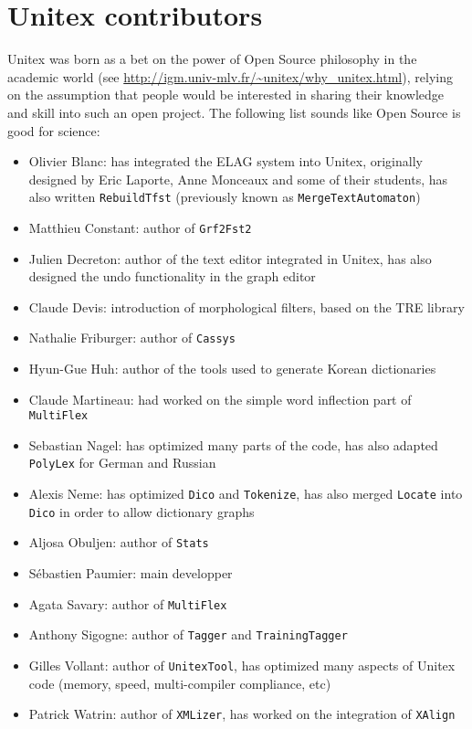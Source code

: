 \section*{Unitex contributors}
Unitex was born as a bet on the power of Open Source philosophy in the academic
world (see \url{http://igm.univ-mlv.fr/~unitex/why_unitex.html}), 
relying on the assumption that people would be interested in sharing
their knowledge and skill into such an open project. The following list
sounds like Open Source is good for science:

\begin{itemize}
    \item Olivier Blanc: has integrated the ELAG system into Unitex, originally
    designed by Eric Laporte, Anne Monceaux and some of their students, has
    also written \verb+RebuildTfst+ (previously known as \verb+MergeTextAutomaton+)
    \item Matthieu Constant: author of \verb+Grf2Fst2+
    \item Julien Decreton: author of the text editor integrated in Unitex,
    has also designed the undo functionality in the graph editor
    \item Claude Devis: introduction of morphological filters, 
    based on the TRE library
    \item Nathalie Friburger: author of \verb+Cassys+
    \item Hyun-Gue Huh: author of the tools used to
    generate Korean dictionaries
    \item Claude Martineau: had worked on the simple word inflection part of
    \verb+MultiFlex+
    \item Sebastian Nagel: has optimized many parts of the code, has also
    adapted \verb+PolyLex+ for German and Russian
    \item Alexis Neme: has optimized \verb+Dico+ and \verb+Tokenize+, has also
    merged \verb+Locate+ into \verb+Dico+ in order to allow dictionary graphs 
    \item Aljosa Obuljen: author of \verb+Stats+
    \item S\'ebastien Paumier: main developper
    \item Agata Savary: author of \verb+MultiFlex+
    \item Anthony Sigogne: author of \verb+Tagger+ and \verb+TrainingTagger+
    \item Gilles Vollant: author of \verb+UnitexTool+, has optimized many
    aspects of Unitex code (memory, speed, multi-compiler compliance, etc)
    \item Patrick Watrin: author of \verb+XMLizer+, has worked on the
    integration of \verb+XAlign+
\end{itemize}

